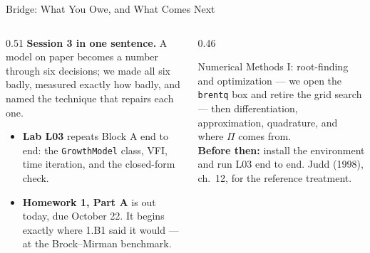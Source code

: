 \begin{frame}{Bridge: What You Owe, and What Comes Next}
\begin{columns}[T]
\begin{column}{0.51\textwidth}
\small
\textbf{Session 3 in one sentence.} A model on paper becomes a number through six decisions; we made all six badly, measured exactly how badly, and named the technique that repairs each one.
\medskip
\begin{itemize}\footnotesize
  \item \textbf{Lab L03} repeats Block A end to end: the \texttt{GrowthModel} class, VFI, time iteration, and the closed-form check.
  \item \textbf{Homework 1, Part A} is out today, due October 22. It begins exactly where 1.B1 said it would --- at the Brock--Mirman benchmark.
\end{itemize}
\end{column}
\begin{column}{0.46\textwidth}
\begin{conceptbox}[title=\textbf{Next week (S4)}]\small
Numerical Methods I: root-finding and optimization --- we open the \texttt{brentq} box and retire the grid search --- then differentiation, approximation, quadrature, and where $\Pi$ comes from.\\[1mm]
\textbf{Before then:} install the environment and run L03 end to end. Judd (1998), ch.~12, for the reference treatment.
\end{conceptbox}
\end{column}
\end{columns}
\end{frame}


